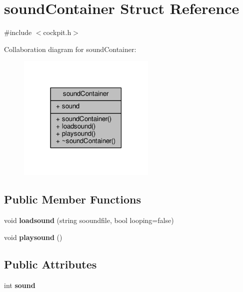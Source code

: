 \hypertarget{structsoundContainer}{}\section{sound\+Container Struct Reference}
\label{structsoundContainer}


{\ttfamily \#include $<$cockpit.\+h$>$}



Collaboration diagram for sound\+Container\+:
\nopagebreak
\begin{figure}[H]
\begin{center}
\leavevmode
\includegraphics[width=186pt]{d9/d9e/structsoundContainer__coll__graph}
\end{center}
\end{figure}
\subsection*{Public Member Functions}
\begin{DoxyCompactItemize}
\item 
void {\bfseries loadsound} (string sooundfile, bool looping=false)\hypertarget{structsoundContainer_a6e42698d5b897da460d6dfa508057a65}{}\label{structsoundContainer_a6e42698d5b897da460d6dfa508057a65}

\item 
void {\bfseries playsound} ()\hypertarget{structsoundContainer_aac69bbc211b93652cc58f0352e51ddec}{}\label{structsoundContainer_aac69bbc211b93652cc58f0352e51ddec}

\end{DoxyCompactItemize}
\subsection*{Public Attributes}
\begin{DoxyCompactItemize}
\item 
int {\bfseries sound}\hypertarget{structsoundContainer_acf5a9448255538d1037c5040c393841c}{}\label{structsoundContainer_acf5a9448255538d1037c5040c393841c}

\end{DoxyCompactItemize}


